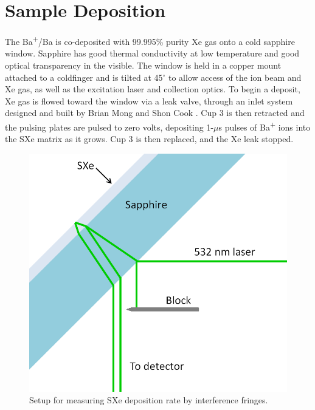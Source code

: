 \section{Sample Deposition}
\label{sec:deposition}

The Ba\textsuperscript{+}/Ba is co-deposited with 99.995\% purity Xe gas onto a cold sapphire window.  Sapphire has good thermal conductivity at low temperature and good optical transparency in the visible.  The window is held in a copper mount attached to a coldfinger and is tilted at 45$^{\circ}$ to allow access of the ion beam and Xe gas, as well as the excitation laser and collection optics.  To begin a deposit, Xe gas is flowed toward the window via a leak valve, through an inlet system designed and built by Brian Mong and Shon Cook \cite{Brian,Shon}.  Cup 3 is then retracted and the pulsing plates are pulsed to zero volts, depositing 1-$\mu$s pulses of Ba\textsuperscript{+} ions into the SXe matrix as it grows.  Cup 3 is then replaced, and the Xe leak stopped.

\begin{figure} %
        \centering
                \includegraphics[width=.4\textwidth]{figures/fringe_setup.png}
                \caption{Setup for measuring SXe deposition rate by interference fringes.}
\label{fig:fringe_setup}
\end{figure}

